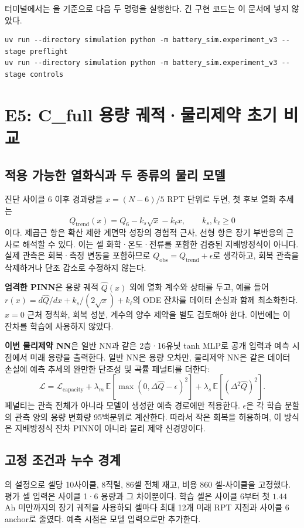 터미널에서는 을 기준으로 다음 두 명령을 실행한다. 긴 구현 코드는 이 문서에 넣지 않았다.
\begin{Verbatim}[fontsize=\small]
uv run --directory simulation python -m battery_sim.experiment_v3 --stage preflight
uv run --directory simulation python -m battery_sim.experiment_v3 --stage controls
\end{Verbatim}

\clearpage
\section{E5: C\_full 용량 궤적·물리제약 초기 비교}

\subsection*{적용 가능한 열화식과 두 종류의 물리 모델}
진단 사이클 6 이후 경과량을 $x=(N-6)/5$ RPT 단위로 두면, 첫 후보 열화 추세는
\[
Q_{\mathrm{trend}}(x)=Q_6-k_s\sqrt{x}-k_\ell x,\qquad k_s,k_\ell\ge 0
\]
이다. 제곱근 항은 확산 제한 계면막 성장의 경험적 근사, 선형 항은 장기 부반응의 근사로 해석할 수 있다. 이는 셀 화학·온도·전류를 포함한 검증된 지배방정식이 아니다. 실제 관측은 회복·측정 변동을 포함하므로 $Q_{\mathrm{obs}}=Q_{\mathrm{trend}}+\epsilon$로 생각하고, 회복 관측을 삭제하거나 단조 감소로 수정하지 않는다.

\textbf{엄격한 PINN}은 용량 궤적 $\hat Q(x)$ 외에 열화 계수와 상태를 두고, 예를 들어
$r(x)=d\hat Q/dx+k_s/(2\sqrt{x})+k_\ell$의 ODE 잔차를 데이터 손실과 함께 최소화한다. $x=0$ 근처 정칙화, 회복 성분, 계수의 양수 제약을 별도 검토해야 한다. 이번에는 이 잔차를 학습에 사용하지 않았다.

\textbf{이번 물리제약 NN}은 일반 NN과 같은 2층·16유닛 tanh MLP로 공개 입력과 예측 시점에서 미래 용량을 출력한다. 일반 NN은 용량 오차만, 물리제약 NN은 같은 데이터 손실에 예측 추세의 완만한 단조성 및 곡률 페널티를 더한다:
\[
\mathcal L=\mathcal L_{\mathrm{capacity}}+
\lambda_m\,\mathbb E[\max(0,\Delta\hat Q-\epsilon)^2]
+\lambda_s\,\mathbb E[(\Delta^2\hat Q)^2].
\]
페널티는 관측 전체가 아니라 모델이 생성한 예측 경로에만 적용한다. $\epsilon$은 각 학습 분할의 관측 양의 용량 변화량 95백분위로 계산한다. 따라서 작은 회복을 허용하며, 이 방식은 지배방정식 잔차 PINN이 아니라 물리 제약 신경망이다.

\subsection*{고정 조건과 누수 경계}
의 설정으로 셀당 10사이클, 8직렬, 86셀 전체 재고, 비용 860 셀-사이클을 고정했다. 평가 셀 입력은 사이클 1·6 용량과 그 차이뿐이다. 학습 셀은 사이클 6부터 첫 $1.44$ Ah 미만까지의 장기 궤적을 사용하되 셀마다 최대 12개 미래 RPT 지점과 사이클 6 anchor로 줄였다. 예측 시점은 모델 입력으로만 추가한다.

